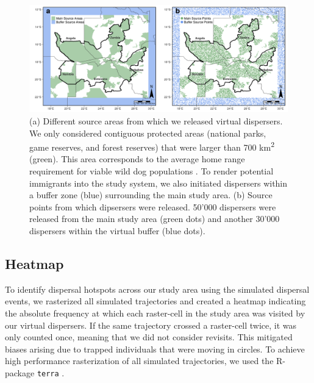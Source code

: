 \documentclass[abstract=on,10pt,a4paper,bibliography=totocnumbered]{article}
\begin{document}
\begin{figure}[htbp]
  \begin{center}
    \includegraphics[width = \textwidth]{99_SourceAreas.png}
    \caption{(a) Different source areas from which we released virtual
    dispersers. We only considered contiguous protected areas (national parks,
    game reserves, and forest reserves) that were larger than 700
    km\textsuperscript{2} (green). This area corresponds to the average home
    range requirement for viable wild dog populations \citep{Pomilia.2015}. To
    render potential immigrants into the study system, we also initiated
    dispersers within a buffer zone (blue) surrounding the main study area. (b)
    Source points from which dipsersers were released. 50'000 dispersers were
    released from the main study area (green dots) and another 30'000 dispersers
    within the virtual buffer (blue dots).}
    \label{SourcePoints}
  \end{center}
\end{figure}

\subsection{Heatmap}
To identify dispersal hotspots across our study area using the simulated
dispersal events, we rasterized all simulated trajectories and created a heatmap
indicating the absolute frequency at which each raster-cell in the study area
was visited by our virtual dispersers. If the same trajectory crossed a
raster-cell twice, it was only counted once, meaning that we did not consider
revisits. This mitigated biases arising due to trapped individuals that were
moving in circles. To achieve high performance rasterization of all simulated
trajectories, we used the R-package {\tt terra} \citep{Hijmans.2020}.
\end{document}
